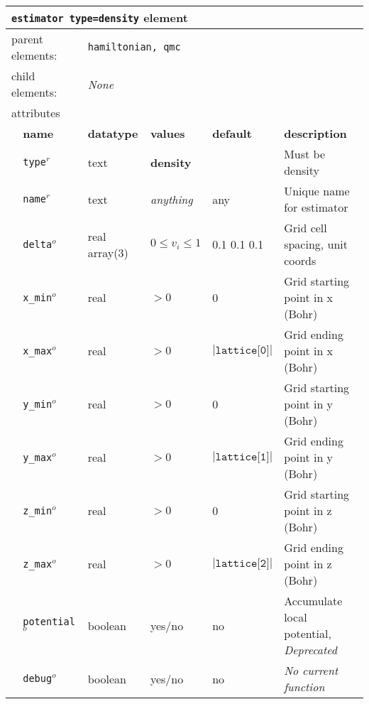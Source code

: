 \FloatBarrier
\begin{table}[h]
\begin{center}
\begin{tabularx}{\textwidth}{l l l l l X }
\hline
\multicolumn{6}{l}{\texttt{estimator type=density} element} \\
\hline
\multicolumn{2}{l}{parent elements:} & \multicolumn{4}{l}{\texttt{hamiltonian, qmc}}\\
\multicolumn{2}{l}{child  elements:} & \multicolumn{4}{l}{\textit{None}}\\
\multicolumn{2}{l}{attributes}  & \multicolumn{4}{l}{}\\
   &   \bfseries name     & \bfseries datatype & \bfseries values  & \bfseries default   & \bfseries description \\
   & \texttt{type}$^r$      &  text              & \textbf{density}      &                     & Must be density         \\
   & \texttt{name}$^r$      &  text              & \textit{anything}     & any                 & Unique name for estimator \\
   & \texttt{delta}$^o$     &  real array(3)     & $0\le v_i \le 1$      & 0.1 0.1 0.1         & Grid cell spacing, unit coords\\
   & \texttt{x\_min}$^o$    &  real              & $>0$                  & 0                   & Grid starting point in x (Bohr)\\
   & \texttt{x\_max}$^o$    &  real              & $>0$                  &$|\texttt{lattice[0]}|$& Grid ending point in x (Bohr)\\
   & \texttt{y\_min}$^o$    &  real              & $>0$                  & 0                   & Grid starting point in y (Bohr)\\
   & \texttt{y\_max}$^o$    &  real              & $>0$                  &$|\texttt{lattice[1]}|$& Grid ending point in y (Bohr)\\
   & \texttt{z\_min}$^o$    &  real              & $>0$                  & 0                   & Grid starting point in z (Bohr)\\
   & \texttt{z\_max}$^o$    &  real              & $>0$                  &$|\texttt{lattice[2]}|$& Grid ending point in z (Bohr)\\
   & \texttt{potential}$^o$ &  boolean           & yes/no                & no                  & Accumulate local potential, \textit{Deprecated}\\
   & \texttt{debug}$^o$     &  boolean           & yes/no                & no                  & \textit{No current function}\\
  \hline
\end{tabularx}
\end{center}
\end{table}
\FloatBarrier


